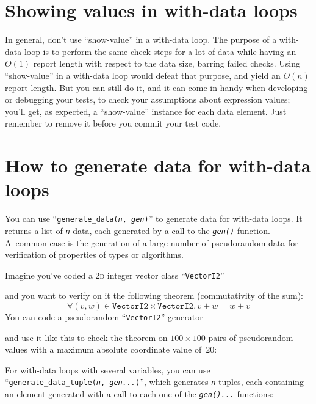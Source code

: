 \documentclass[twoside, a4paper, article]{memoir}
\providecommand\typesetexample[1]{%
}
\begin{document}
\typesetexample{with-multiline-data}

\section{Showing values in with-data loops}
\label{sec:showing-values-with-data-loops}

In general, don't use ``show-value'' in a with-data loop.  The purpose of a
with-data loop is to perform the same check steps for a lot of data while
having an $O(1)$ report length with respect to the data size, barring failed
checks.  Using ``show-value'' in a with-data loop would defeat that purpose,
and yield an $O(n)$ report length.  But you can still do it, and it can come in
handy when developing or debugging your tests, to check your assumptions about
expression values; you'll get, as expected, a ``show-value'' instance for each
data element.  Just remember to remove it before you commit your test code.


\section{How to generate data for with-data loops}
\label{sec:generate-data-with-data-loops}

You can use ``\texttt{generate\_data(\textit{n}, \textit{gen})}'' to generate
data for with-data loops.  It returns a list of \texttt{\textit{n}} data, each
generated by a call to the \texttt{\textit{gen()}} function.  A~common case is
the generation of a large number of pseudorandom data for verification of
properties of types or algorithms.

Imagine you've coded a \textsc{2d} integer vector class ``\texttt{VectorI2}''
\typesetexample{data-for-with-data-vector}
and you want to verify on it the following theorem (commutativity of the sum):
\begin{equation}
  \label{eq:1}
  \forall (v, w) \in \texttt{VectorI2} \times \texttt{VectorI2}, v + w = w + v
\end{equation}
You can code a pseudorandom ``\texttt{VectorI2}'' generator
\typesetexample{data-for-with-data-generator}
and use it like this to check the theorem on $100 \times 100$ pairs of
pseudorandom values with a maximum absolute coordinate value of~$20$:

\typesetexample{data-for-with-data-loop}

For with-data loops with several variables, you can use
``\texttt{generate\_data\_tuple(\textit{n}, \textit{gen...})}'', which
generates \texttt{\textit{n}} tuples, each containing an element generated with
a call to each one of the \texttt{\textit{gen()...}} functions:
\end{document}
